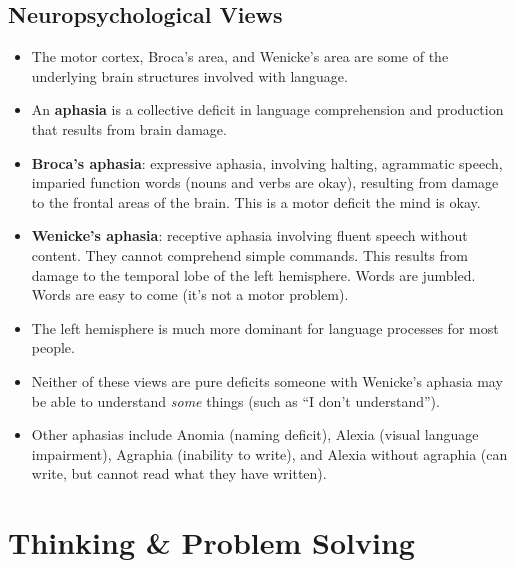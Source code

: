 \documentclass[]{article}
\newcommand{\lecture}[1]{\marginpar{{\footnotesize $\leftarrow$ \underline{#1}}}}
\begin{document}
		\subsection{Neuropsychological Views}
			\begin{itemize}
				\item The motor cortex, Broca's area, and Wenicke's area are some of the underlying brain structures involved with language.
				\item An \textbf{aphasia} is a collective deficit in language comprehension and production that results from brain damage.
				\item \textbf{Broca's aphasia}: expressive aphasia, involving halting, agrammatic speech, imparied function words (nouns and verbs are okay), resulting from damage to the frontal areas of the brain. This is a motor deficit \textendash{} the mind is okay.
				\item \textbf{Wenicke's aphasia}: receptive aphasia involving fluent speech without content. They cannot comprehend simple commands. This results from damage to the temporal lobe of the left hemisphere. Words are jumbled. Words are easy to come (it's not a motor problem).
				\item The left hemisphere is much more dominant for language processes for most people.
				\item Neither of these views are pure deficits \textendash{} someone with Wenicke's aphasia may be able to understand \emph{some} things (such as ``I don't understand'').
				\item Other aphasias include Anomia (naming deficit), Alexia (visual language impairment), Agraphia (inability to write), and Alexia without agraphia (can write, but cannot read what they have written).
			\end{itemize}

	\section{Thinking \& Problem Solving} \lecture{March 19, 2013}
\end{document}
